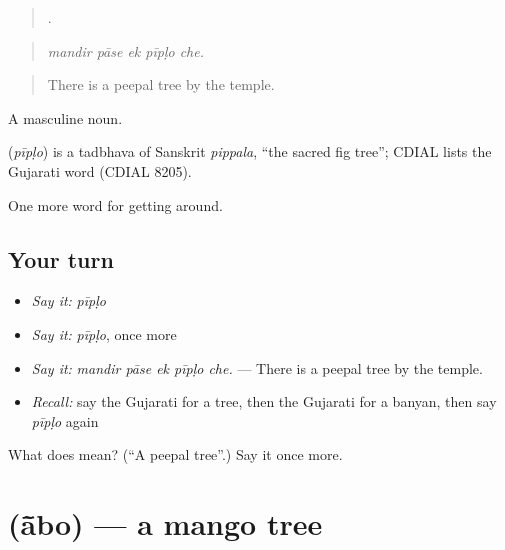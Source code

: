 \begin{quote}
    .
\end{quote}

\begin{quote}
\emph{mandir pāse ek pīpḷo che.}
\end{quote}

\begin{quote}
There is a peepal tree by the temple.
\end{quote}

A masculine noun.

\begin{cousinweb}
\textbf{} (\emph{pīpḷo}) is a tadbhava of Sanskrit \emph{pippala}, \textquotedblleft{}the sacred fig tree\textquotedblright{}; CDIAL lists the Gujarati word (CDIAL 8205).
\end{cousinweb}

\begin{grammarlens}[title={What you've built}]
One more word for getting around.
\end{grammarlens}

\subsection*{Your turn}
\begin{itemize}
\raggedright
  \item \emph{Say it:} \emph{pīpḷo}
  \item \emph{Say it:} \emph{pīpḷo}, once more
  \item \emph{Say it:} \emph{mandir pāse ek pīpḷo che.} — There is a peepal tree by the temple.
  \item \emph{Recall:} say the Gujarati for a tree, then the Gujarati for a banyan, then say \emph{pīpḷo} again
\end{itemize}

\begin{tcolorbox}[breakable,colback=teal!4,colframe=teal!35!black,title={Before you move on}]
What does  mean? (\textquotedblleft{}A peepal tree\textquotedblright{}.) Say it once more.
\end{tcolorbox}
\section[\texorpdfstring{\gu{આંબો} (ā̃bo)}{આંબો (ā̃bo)}]{ (ā̃bo) — a mango tree}

\label{lesson:GU-C443-abo}



